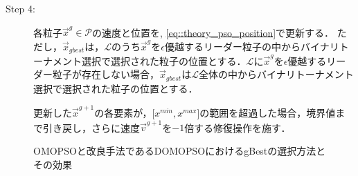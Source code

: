 \begin{description} \label{algo::DOMOPSO}
  \setlength{\listparindent}{0pt}   %
  \setlength{\itemsep}{0pt}      %
  \item[Step 4:]
        各粒子$\vec{x}^g \in \mathcal{P}$の速度と位置を, \eqref{eq::theory_pso_position}で更新する．
        ただし，$\vec{x}_{gbest}$は，$\mathcal{L}$のうち$\vec{x}^g$を$\epsilon$優越するリーダー粒子の中からバイナリトーナメント選択で選択された粒子の位置とする．$\mathcal{L}$に$\vec{x}^g$を$\epsilon$優越するリーダー粒子が存在しない場合，$\vec{x}_{gbest}$は$\mathcal{L}$全体の中からバイナリトーナメント選択で選択された粒子の位置とする．

        更新した$\vec{x}^{g+1}$の各要素が，[$x^{min}, x^{max}$]の範囲を超過した場合，境界値まで引き戻し，さらに速度$\vec{v}^{g+1}$を$-1$倍する修復操作を施す．
\end{description}

\begin{figure}[htbp]
  \centering
  \caption{OMOPSOと改良手法であるDOMOPSOにおけるgBestの選択方法とその効果}
  \label{fig::surrogate_algorithm}
\end{figure}

